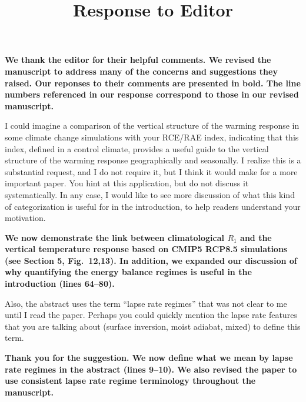 \documentclass{article}
\title{\vspace{-2.5cm}Response to Editor\vspace{-2cm}}
\date{}
\author{}
\begin{document}
\maketitle

\textbf{We thank the editor for their helpful comments. We revised the manuscript to address many of the concerns and suggestions they raised. Our reponses to their comments are presented in bold. The line numbers referenced in our response correspond to those in our revised manuscript.}

I could imagine a comparison of the vertical structure of the warming response in some climate change simulations with your RCE/RAE index, indicating that this index, defined in a control climate, provides a useful guide to the vertical structure of the warming response geographically and seasonally.  I realize this is a substantial request, and I do not require it, but I think it would make for a more important paper.  You hint at this application, but do not discuss it systematically.  In any case, I would like to see more discussion of what this kind of categorization is useful for in the introduction, to help readers understand your motivation. 

\textbf{We now demonstrate the link between climatological $R_1$ and the vertical temperature response based on CMIP5 RCP8.5 simulations (see Section 5, Fig.~12,13). In addition, we expanded our discussion of why quantifying the energy balance regimes is useful in the introduction (lines 64--80). }

Also, the abstract uses the term “lapse rate regimes” that was not clear to me until I read the paper.  Perhaps you could quickly mention the lapse rate features that you are talking about (surface inversion, moist adiabat, mixed) to define this term.

\textbf{Thank you for the suggestion. We now define what we mean by lapse rate regimes in the abstract (lines 9--10). We also revised the paper to use consistent lapse rate regime terminology throughout the manuscript.}

% 
% 
\end{document}
